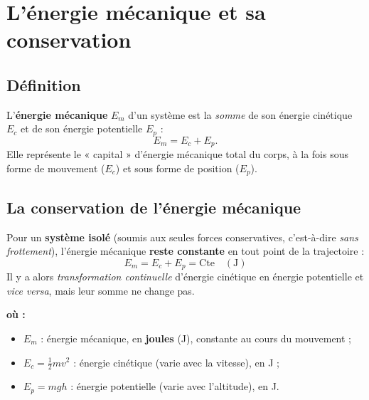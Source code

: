 \documentclass[11pt,a4paper]{article}
\newenvironment{ou}{%
  \par\smallskip\noindent\textbf{où :}\nopagebreak
  \begin{itemize}[leftmargin=1.8em,topsep=2pt,itemsep=1.5pt,parsep=0pt]}%
  {\end{itemize}}
\begin{document}
\section{L'énergie mécanique et sa conservation}
\subsection{Définition}

\begin{definition}
L'\textbf{énergie mécanique} $E_m$ d'un système est la \emph{somme} de son énergie cinétique $E_c$
et de son énergie potentielle $E_p$ :
\[
E_m=E_c+E_p .
\]
Elle représente le « capital » d'énergie mécanique total du corps, à la fois sous forme de mouvement
($E_c$) et sous forme de position ($E_p$).
\end{definition}

\subsection{La conservation de l'énergie mécanique}

\begin{theoreme}
Pour un \textbf{système isolé} (soumis aux seules forces conservatives, c'est-à-dire \emph{sans
frottement}), l'énergie mécanique \textbf{reste constante} en tout point de la trajectoire :
\[
\boxed{\;E_m=E_c+E_p=\text{Cte}\quad(\si{\joule})\;}
\]
Il y a alors \emph{transformation continuelle} d'énergie cinétique en énergie potentielle et
\emph{vice versa}, mais leur somme ne change pas.
\end{theoreme}

\begin{ou}
  \item $E_m$ : énergie mécanique, en \textbf{joules} (\si{\joule}), constante au cours du mouvement ;
  \item $E_c=\tfrac12 m v^2$ : énergie cinétique (varie avec la vitesse), en \si{\joule} ;
  \item $E_p=mgh$ : énergie potentielle (varie avec l'altitude), en \si{\joule}.
\end{ou}
\end{document}
